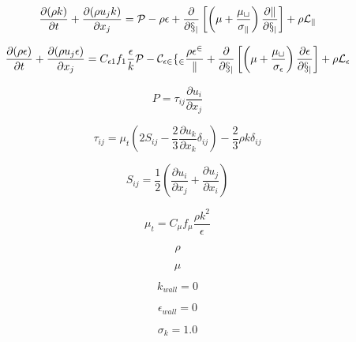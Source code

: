 

\begin{equation}
\frac{\partial (\rho k)}{\partial t} + \frac{\partial (\rho u_j k)}{\partial x_j}
  = \cal P - \rho \epsilon  + \frac{\partial}{\partial x_j}
  \left[\left(\mu + \frac{\mu_t}{\sigma_k} \right)\frac{\partial k}{\partial x_j}\right]
  + \rho L_k
\end{equation}

\begin{equation}
\frac{\partial (\rho \epsilon)}{\partial t} + \frac{\partial (\rho u_j \epsilon)}{\partial x_j}
  = C_{\epsilon 1} f_1 \frac{\epsilon}{k} \cal P -
  C_{\epsilon 2} f_2 \frac{\rho \epsilon^2}{k} + \frac{\partial}{\partial x_j}
  \left[ \left( \mu + \frac{\mu_t}{\sigma_{\epsilon}} \right)
  \frac{\partial \epsilon}{\partial x_j} \right] +
  \rho L_{\epsilon}
\end{equation}

\begin{equation}
P = \tau_{ij} \frac{\partial u_i}{\partial x_j}
\end{equation}

\begin{equation}
\tau_{ij} = \mu_t \left(2S_{ij} - \frac{2}{3} \frac{\partial u_k}{\partial x_k} \delta_{ij} \right)
   - \frac{2}{3} \rho k \delta_{ij}
\end{equation}

\begin{equation}
S_{ij} = \frac{1}{2} \left( \frac{\partial u_i}{\partial x_j} + \frac{\partial u_j}{\partial x_i} \right)
\end{equation}

\begin{equation}
\mu_t = C_{\mu} f_{\mu} \frac{\rho k^2}{\epsilon}
\end{equation}

\begin{equation}
\rho
\end{equation}

\begin{equation}
\mu
\end{equation}

\begin{equation}
k_{wall} = 0
\end{equation}

\begin{equation}
\epsilon_{wall} = 0
\end{equation}

\begin{equation}
\sigma_k = 1.0
\end{equation}

